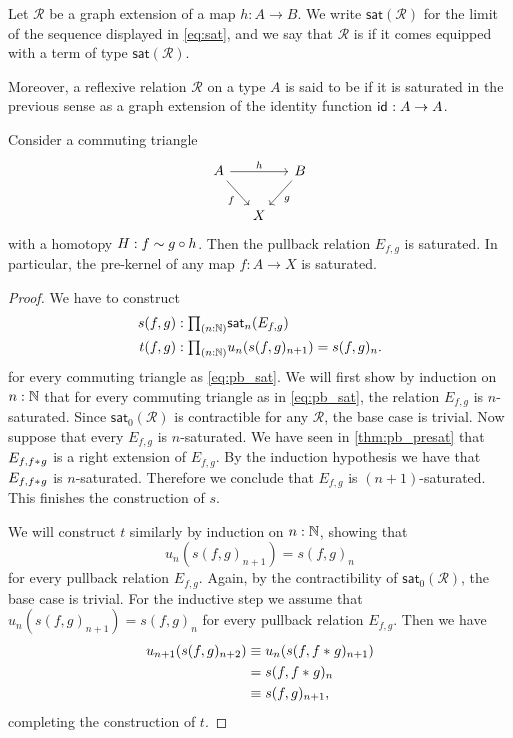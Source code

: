 \begin{defn}
Let $\mathcal{R}$ be a graph extension of a map $h:A\to B$. We write $\mathsf{sat}(\mathcal{R})$ for the limit of the sequence displayed in \cref{eq:sat}, and we say that $\mathcal{R}$ is  if it comes equipped with a term of type $\mathsf{sat}(\mathcal{R})$. 

Moreover, a reflexive relation $\mathcal{R}$ on a type $A$ is said to be  if it is saturated in the previous sense as a graph extension of the identity function $\mathsf{id}_{}:A\to A$.
\end{defn}

\begin{thm}\label{thm:pb_sat}
Consider a commuting triangle
\begin{equation}\label{eq:pb_sat}
\begin{tikzcd}[column sep=small]
A \arrow[rr,"h"] \arrow[dr,swap,"f"] & & B \arrow[dl,"g"] \\
& X
\end{tikzcd}
\end{equation}
with a homotopy $H:f\sim g\circ h$. Then the pullback relation $E_{f,g}$ is saturated. In particular, the pre-kernel of any map $f:A\to X$ is saturated.
\end{thm}

\begin{proof}
We have to construct
\begin{align*}
s(f,g) & : \prd{n:\N} \mathsf{sat}_n(E_{f,g}) \\
t(f,g) & : \prd{n:\N} u_n(s(f,g)_{n+1})=s(f,g)_n. 
\end{align*}
for every commuting triangle as \cref{eq:pb_sat}. We will first show by induction on $n:\mathbb{N}$ that for every commuting triangle as in \cref{eq:pb_sat}, the relation $E_{f,g}$ is $n$-saturated. Since $\mathsf{sat}_0(\mathcal{R})$ is contractible for any $\mathcal{R}$, the base case is trivial.
Now suppose that every $E_{f,g}$ is $n$-saturated. We have seen in \cref{thm:pb_presat} that $E_{f,{f}\ast_{}{g}}$ is a right extension of $E_{f,g}$. By the induction hypothesis we have that $E_{f,{f}\ast_{}{g}}$ is $n$-saturated. Therefore we conclude that $E_{f,g}$ is $(n+1)$-saturated. This finishes the construction of $s$.

We will construct $t$ similarly by induction on $n:\mathbb{N}$, showing that 
\begin{equation*}
u_n(s(f,g)_{n+1})=s(f,g)_n
\end{equation*}
for every pullback relation $E_{f,g}$. Again, by the contractibility of $\mathsf{sat}_0(\mathcal{R})$, the base case is trivial. For the inductive step we assume that $u_n(s(f,g)_{n+1})=s(f,g)_n$ for every pullback relation $E_{f,g}$. Then we have
\begin{align*}
u_{n+1}(s(f,g)_{n+2}) & \equiv u_n(s(f,{f}\ast_{}{g})_{n+1}) \\
& = s(f,{f}\ast_{}{g})_n \\
& \equiv s(f,g)_{n+1},
\end{align*}
completing the construction of $t$. 
\end{proof}

